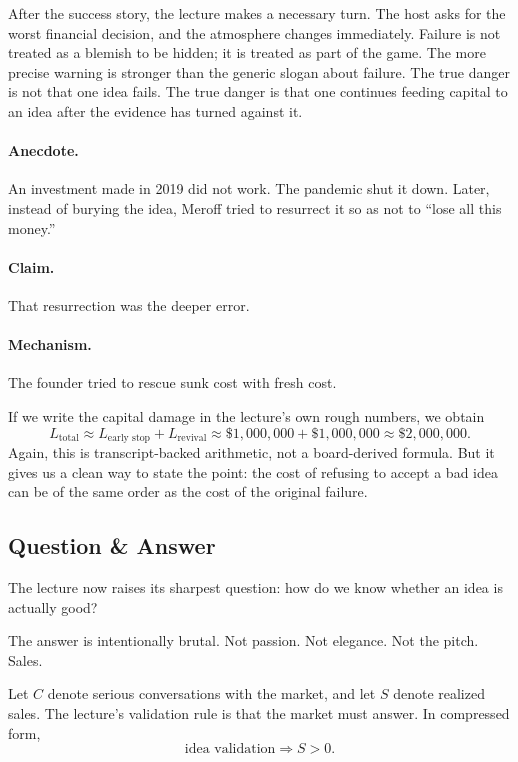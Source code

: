 After the success story, the lecture makes a necessary turn. The host asks for the worst financial decision, and the atmosphere changes immediately. Failure is not treated as a blemish to be hidden; it is treated as part of the game. The more precise warning is stronger than the generic slogan about failure. The true danger is not that one idea fails. The true danger is that one continues feeding capital to an idea after the evidence has turned against it.

\paragraph{Anecdote.}
An investment made in 2019 did not work. The pandemic shut it down. Later, instead of burying the idea, Meroff tried to resurrect it so as not to ``lose all this money.''

\paragraph{Claim.}
That resurrection was the deeper error.

\paragraph{Mechanism.}
The founder tried to rescue sunk cost with fresh cost.

If we write the capital damage in the lecture's own rough numbers, we obtain
\begin{equation}
L_{\text{total}}
\approx
L_{\text{early stop}} + L_{\text{revival}}
\approx
\text{\$}1{,}000{,}000 + \text{\$}1{,}000{,}000
\approx
\text{\$}2{,}000{,}000.
\end{equation}
Again, this is transcript-backed arithmetic, not a board-derived formula. But it gives us a clean way to state the point: the cost of refusing to accept a bad idea can be of the same order as the cost of the original failure.

\subsection{Question \& Answer}

The lecture now raises its sharpest question: how do we know whether an idea is actually good?

The answer is intentionally brutal. Not passion. Not elegance. Not the pitch. Sales.

\begin{definition}
Let $C$ denote serious conversations with the market, and let $S$ denote realized sales. The lecture's validation rule is that the market must answer. In compressed form,
\begin{equation}
\text{idea validation} \Rightarrow S>0.
\end{equation}
\end{definition}

